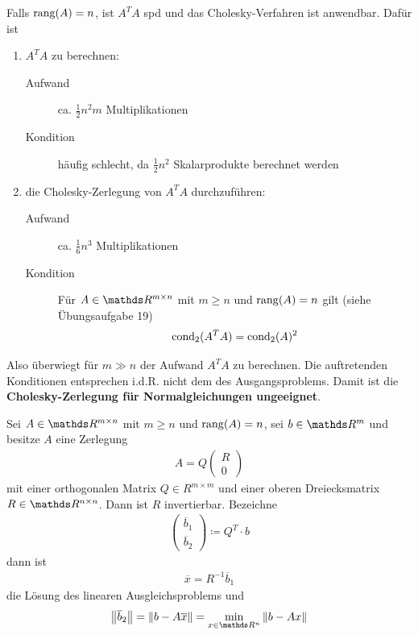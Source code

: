 Falls $\operatorname{rang}(A) = n$, ist $A^TA$ spd und das Cholesky-Verfahren ist anwendbar.
Dafür ist
\begin{enumerate}[1.]
\item $A^TA$ zu berechnen:
  \begin{description}
  \item[Aufwand] ca. $\frac{1}{2}n^2m$ Multiplikationen 
  \item[Kondition] häufig schlecht, da $\frac{1}{2}n^2$ Skalarprodukte berechnet werden
  \end{description}
\item die Cholesky-Zerlegung von $A^TA $ durchzuführen:
  \begin{description}
  \item[Aufwand] ca. $\frac{1}{6}n^3$ Multiplikationen 
  \item[Kondition] Für $A\in\R^{m\times n}$ mit $m\geq n$ und
    $\operatorname{rang}(A)=n$ gilt
    (siehe Übungsaufgabe 19)
    \begin{gather}
      \operatorname{cond}_2(A^TA) = \operatorname{cond}_2(A)^2 \label{IV.3.7}
    \end{gather}
  \end{description}
\end{enumerate}
Also überwiegt für $m\gg n$ der Aufwand $A^TA$ zu berechnen.
Die auftretenden Konditionen entsprechen 
i.d.R. nicht dem des Ausgangsproblems.
Damit ist die 
\textbf{Cholesky-Zerlegung 
  für Normalgleichungen ungeeignet}.


\begin{Satze}
  Sei $A\in \R^{m\times n} $ mit $m\geq n$ und $\operatorname{rang}(A) = n$,
  sei $b\in\R^m$ und besitze $A$ eine Zerlegung
  \begin{gather*}
    A= Q\begin{pmatrix}R\\0\end{pmatrix}
  \end{gather*}
  mit einer orthogonalen Matrix $Q\in R^{m\times m}$ und 
  einer oberen Dreiecksmatrix $R\in \R^{n\times n}$. 
  Dann ist $R$ invertierbar. 
  Bezeichne 
  \begin{gather}
    \begin{pmatrix} \overline{b}_1 \\ \overline{b}_2\end{pmatrix}
    \coloneqq Q^T\cdot b
    \label{IV.3.9}
  \end{gather}
  dann ist
  \begin{gather}
    \overline{x} = R^{-1} \overline{b}_1 
    \label{IV.3.10}
  \end{gather}
  die Lösung des linearen Ausgleichsproblems und
  \begin{gather*}
    \nn[\overline{b}_2] = \nn[b-A\overline{x}] 
    = \min_{x\in \Ren }\nn[b-Ax]
  \end{gather*}
\end{Satze}

